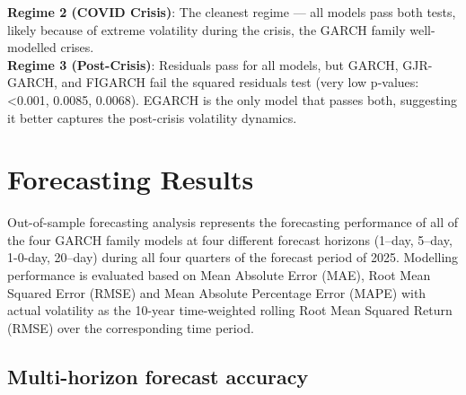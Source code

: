 \textbf{Regime 2 (COVID Crisis)}: The cleanest regime — all models pass both tests, likely because of extreme volatility during the crisis, the GARCH family well-modelled crises.\\

\textbf{Regime 3 (Post-Crisis)}: Residuals pass for all models, but GARCH, GJR-GARCH, and FIGARCH fail the squared residuals test (very low p-values: <0.001, 0.0085, 0.0068). EGARCH is the only model that passes both, suggesting it better captures the post-crisis volatility dynamics.



\section{Forecasting Results}


Out-of-sample forecasting analysis represents the forecasting performance of all of the four GARCH family models at four different forecast horizons (1--day, 5--day, 1-0-day, 20--day) during all four quarters of the forecast period of 2025. Modelling performance is evaluated based on Mean Absolute Error (MAE), Root Mean Squared Error (RMSE) and Mean Absolute Percentage Error (MAPE) with actual volatility as the 10-year time-weighted rolling Root Mean Squared Return (RMSE) over the corresponding time period.

\subsection{Multi-horizon forecast accuracy}


